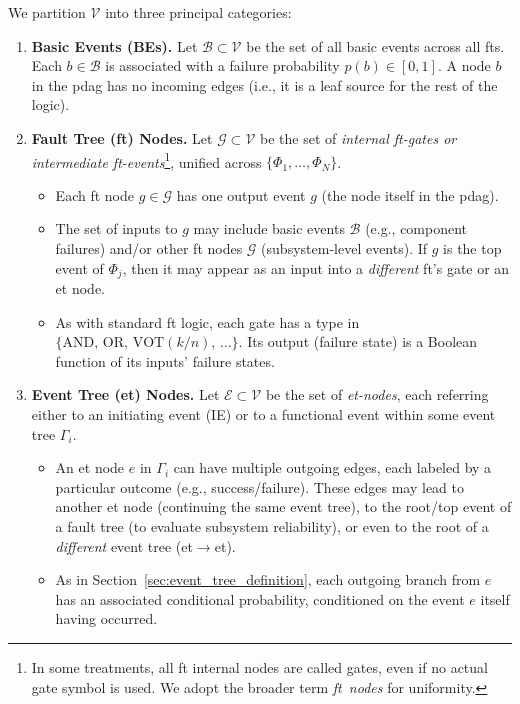 We partition \(\mathcal{V}\) into three principal categories:
\begin{enumerate}
\item \textbf{Basic Events (BEs).}  Let \(\mathcal{B}\subset \mathcal{V}\) be the set of all basic events across all \acrshort{ft}s.  Each \(b\in\mathcal{B}\) is associated with a failure probability \(p(b)\in [0,1]\).  A node \(b\) in the \acrshort{pdag} has no incoming edges (i.e., it is a leaf source for the rest of the logic).  

\item \textbf{Fault Tree (\acrshort{ft}) Nodes.}  Let \(\mathcal{G}\subset \mathcal{V}\) be the set of \emph{internal \acrshort{ft}-gates or intermediate \acrshort{ft}-events}\footnote{In some treatments, all \acrshort{ft} internal nodes are called gates, even if no actual gate symbol is used.  We adopt the broader term \emph{\acrshort{ft}~nodes} for uniformity.}, unified across \(\{\Phi_1,\dots,\Phi_N\}\).  
    \begin{itemize}
    \item Each \acrshort{ft} node \(g\in \mathcal{G}\) has one output event \(g\) (the node itself in the \acrshort{pdag}).  
    \item The set of inputs to \(g\) may include basic events \(\mathcal{B}\) (e.g., component failures) and/or other \acrshort{ft} nodes \(\mathcal{G}\) (subsystem-level events). If \(g\) is the top event of \(\Phi_j\), then it may appear as an input into a \emph{different} \acrshort{ft}’s gate or an \acrshort{et} node.  
    \item As with standard \acrshort{ft} logic, each gate has a type in \(\{\mathrm{AND},\,\mathrm{OR},\,\mathrm{VOT}(k/n),\,\ldots\}\).  Its output (failure state) is a Boolean function of its inputs’ failure states.
    \end{itemize}

\item \textbf{Event Tree (\acrshort{et}) Nodes.}  Let \(\mathcal{E}\subset \mathcal{V}\) be the set of \emph{\acrshort{et}-nodes}, each referring either to an initiating event (IE) or to a functional event within some event tree \(\Gamma_i\).  
    \begin{itemize}
    \item An \acrshort{et} node \(e\) in \(\Gamma_i\) can have multiple outgoing edges, each labeled by a particular outcome (e.g., success/failure).  These edges may lead to another \acrshort{et} node (continuing the same event tree), to the root/top event of a fault tree (to evaluate subsystem reliability), or even to the root of a \emph{different} event tree (\acrshort{et}\(\to\)\acrshort{et}).
    \item As in Section~\ref{sec:event_tree_definition}, each outgoing branch from \(e\) has an associated conditional probability, conditioned on the event \(e\) itself having occurred.  
    \end{itemize}
\end{enumerate}
